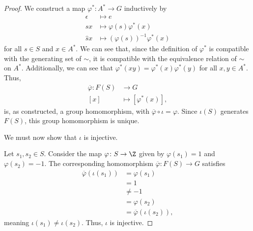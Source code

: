 \documentclass[10pt]{mypackage}
\begin{document}
\begin{proof}
  We construct a map $\varphi^{\ast}\colon A^{\ast}\rightarrow G$ inductively by
  \begin{align*}
    \epsilon &\mapsto e\\
    sx &\mapsto \varphi(s)\varphi^{\ast}\left(x\right)\\
    \hat{s}x &\mapsto \left(\varphi\left(s\right)\right)^{-1}\varphi^{\ast}\left(x\right)
  \end{align*}
  for all $s\in S$ and $x\in A^{\ast}$. We can see that, since the definition of $\varphi^{\ast}$ is compatible with the generating set of $\sim$, it is compatible with the equivalence relation of $\sim$ on $A^{\ast}$. Additionally, we can see that $\varphi^{\ast}\left(xy\right) = \varphi^{\ast}\left(x\right)\varphi^{\ast}\left(y\right)$ for all $x,y\in A^{\ast}$. Thus,
  \begin{align*}
    \overline{\varphi}\colon F\left(S\right) &\rightarrow G\\
    \left[x\right] &\mapsto \left[\varphi^{\ast}\left(x\right)\right],
  \end{align*}
  is, as constructed, a group homomorphism, with $\overline{\varphi}\circ \iota = \varphi$. Since $\iota\left(S\right)$ generates $F(S)$, this group homomorphism is unique.\newline
  
  We must now show that $\iota$ is injective.\newline

  Let $s_1,s_2\in S$. Consider the map $\varphi\colon S\rightarrow \Z$ given by $\varphi\left(s_1\right) = 1$ and $\varphi\left(s_2\right) = -1$. The corresponding homomorphism $\overline{\varphi}\colon F(S)\rightarrow G$ satisfies
  \begin{align*}
    \overline{\varphi}\left(\iota\left(s_1\right)\right) &= \varphi\left(s_1\right)\\
                                                         &= 1\\
                                                         &\neq -1\\
                                                         &= \varphi\left(s_2\right)\\
                                                         &= \overline{\varphi}\left(\iota\left(s_2\right)\right),
  \end{align*}
  meaning $\iota\left(s_1\right)\neq \iota\left(s_2\right)$. Thus, $\iota$ is injective.
\end{proof}
\end{document}
